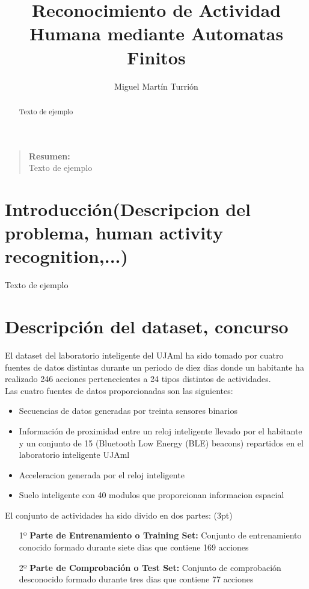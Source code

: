 \documentclass[]{article}
\title{Reconocimiento de Actividad Humana mediante Automatas Finitos}
\author{Miguel Martín Turrión}
\newenvironment{resumen}{
	\begin{quote}
		\textbf{Resumen:} \\
	}{
	\end{quote}
}
\begin{document}
\maketitle

\begin{resumen}
Texto de ejemplo
\end{resumen}

\begin{abstract}
Texto de ejemplo
\end{abstract}

\section{Introducción(Descripcion del problema, human activity recognition,...)}
                Texto de ejemplo
\section{Descripción del dataset, concurso}      
El dataset del laboratorio inteligente del UJAml ha sido tomado por cuatro fuentes de datos distintas durante un periodo de diez dias donde un habitante ha realizado 246 acciones pertenecientes a 24 tipos distintos de actividades. \\

\noindent Las cuatro fuentes de datos proporcionadas son las siguientes:

\begin{itemize}
	\item Secuencias de datos generadas por treinta sensores binarios
	
	\item Información de proximidad entre un reloj inteligente llevado por el habitante y un conjunto de 15 (Bluetooth Low Energy (BLE) beacons) repartidos en el laboratorio inteligente UJAml
	
	\item Acceleracion generada por el reloj inteligente
	
	\item Suelo inteligente con 40 modulos que proporcionan informacion espacial
\end{itemize}
El conjunto de actividades ha sido divido en dos partes:
\vspace(3pt)
\begin{itemize}
	\item[1º]\textbf{Parte de Entrenamiento o Training Set:} Conjunto de entrenamiento conocido formado durante siete dias que contiene 169 acciones
	
	\item[2º]\textbf{Parte de Comprobación o Test Set:} Conjunto de comprobación desconocido formado durante tres dias que contiene 77 acciones
\end{itemize}
\end{document}
